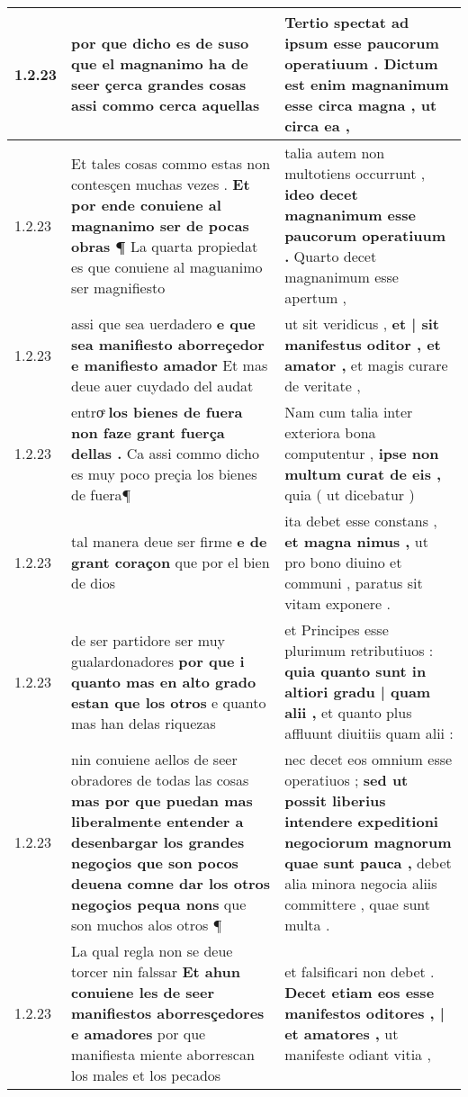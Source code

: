 \begin{tabular}{|p{1cm}|p{6.5cm}|p{6.5cm}|}
1.2.23 & por que dicho es de suso \textbf{ que el magnanimo ha de seer çerca grandes cosas } assi commo cerca aquellas & Tertio spectat ad ipsum esse paucorum operatiuum . \textbf{ Dictum est enim magnanimum esse circa magna , } ut circa ea , \\\hline
1.2.23 & Et tales cosas commo estas non contesçen muchas vezes . \textbf{ Et por ende conuiene al magnanimo ser de pocas obras ¶ } La quarta propiedat es que conuiene al maguanimo ser magnifiesto & talia autem non multotiens occurrunt , \textbf{ ideo decet magnanimum esse paucorum operatiuum . } Quarto decet magnanimum esse apertum , \\\hline
1.2.23 & assi que sea uerdadero \textbf{ e que sea manifiesto aborreçedor e manifiesto amador } Et mas deue auer cuydado del audat & ut sit veridicus , \textbf{ et | sit manifestus oditor , et amator , } et magis curare de veritate , \\\hline
1.2.23 & entroͤ \textbf{ los bienes de fuera non faze grant fuerça dellas . } Ca assi commo dicho es muy poco preçia los bienes de fuera¶ & Nam cum talia inter exteriora bona computentur , \textbf{ ipse non multum curat de eis , } quia ( ut dicebatur ) \\\hline
1.2.23 & tal manera deue ser firme \textbf{ e de grant coraçon } que por el bien de dios & ita debet esse constans , \textbf{ et magna nimus , } ut pro bono diuino et communi , paratus sit vitam exponere . \\\hline
1.2.23 & de ser partidore ser muy gualardonadores \textbf{ por que i quanto mas en alto grado estan que los otros } e quanto mas han delas riquezas & et Principes esse plurimum retributiuos : \textbf{ quia quanto sunt in altiori gradu | quam alii , } et quanto plus affluunt diuitiis quam alii : \\\hline
1.2.23 & nin conuiene aellos de seer obradores de todas las cosas \textbf{ mas por que puedan mas liberalmente entender a desenbargar los grandes negoçios que son pocos deuena comne dar los otros negoçios pequa nons } que son muchos alos otros ¶ & nec decet eos omnium esse operatiuos ; \textbf{ sed ut possit liberius intendere expeditioni negociorum magnorum quae sunt pauca , } debet alia minora negocia aliis committere , quae sunt multa . \\\hline
1.2.23 & La qual regla non se deue torcer nin falssar \textbf{ Et ahun conuiene les de seer manifiestos aborresçedores e amadores } por que manifiesta miente aborrescan los males et los pecados & et falsificari non debet . \textbf{ Decet etiam eos esse manifestos oditores , | et amatores , } ut manifeste odiant vitia , \\\hline

\end{tabular}
